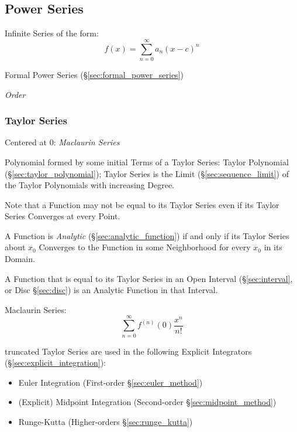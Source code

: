 \subsection{Power Series}\label{sec:power_series}

Infinite Series of the form:
\[
  f(x) = \sum_{n=0}^\infty a_n (x - c)^n
\]

\fist Formal Power Series (\S\ref{sec:formal_power_series})

\emph{Order}



\subsubsection{Taylor Series}\label{sec:taylor_series}

Centered at $0$: \emph{Maclaurin Series}

Polynomial formed by some initial Terms of a Taylor Series: Taylor
Polynomial (\S\ref{sec:taylor_polynomial}); Taylor Series is the Limit
(\S\ref{sec:sequence_limit}) of the Taylor Polynomials with increasing
Degree.

Note that a Function may not be equal to its Taylor Series even if its
Taylor Series Converges at every Point.

A Function is \emph{Analytic} (\S\ref{sec:analytic_function}) if and only if
its Taylor Series about $x_0$ Converges to the Function in some Neighborhood
for every $x_0$ in its Domain.

A Function that is equal to its Taylor Series in an Open Interval
(\S\ref{sec:interval}, or Disc \S\ref{sec:disc}) is an Analytic Function in
that Interval.

Maclaurin Series:
\[
  \sum_{n=0}^\infty f^{(n)}(0) \frac{x^n}{n!}
\]

truncated Taylor Series are used in the following Explicit Integrators
(\S\ref{sec:explicit_integration}):
\begin{itemize}
  \item Euler Integration (First-order \S\ref{sec:euler_method})
  \item (Explicit) Midpoint Integration (Second-order
    \S\ref{sec:midpoint_method})
  \item Runge-Kutta (Higher-orders \S\ref{sec:runge_kutta})
\end{itemize}



